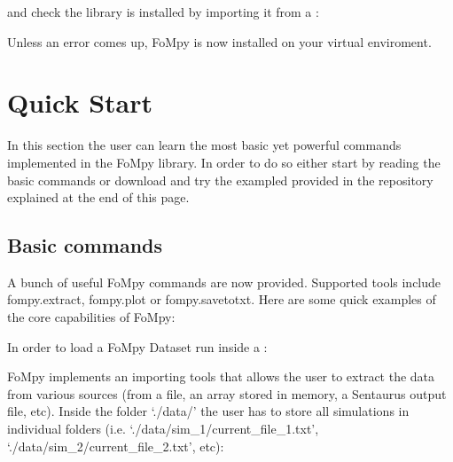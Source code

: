 \documentclass[letterpaper,10pt,english,openany, oneside]{sphinxmanual}
\begin{document}
%
\begin{sphinxVerbatim}[commandchars=\\\{\}]
    
\end{sphinxVerbatim}

and check the library is installed by importing it from a :

%
\begin{sphinxVerbatim}[commandchars=\\\{\}]
 
\end{sphinxVerbatim}

Unless an error comes up, FoMpy is now installed on your virtual enviroment.


\section{Quick Start}
\label{\detokenize{index:quick-start}}
In this section the user can learn the most basic yet powerful commands implemented in the FoMpy library. In order to do so either start by reading the basic commands or
download and try the exampled provided in the repository explained at the end of this page.


\subsection{Basic commands}
\label{\detokenize{index:basic-commands}}
A bunch of useful FoMpy commands are now provided. Supported tools include fompy.extract, fompy.plot or fompy.savetotxt. Here are some quick examples of the core capabilities of FoMpy:

In order to load a FoMpy Dataset run inside a :

%
\begin{sphinxVerbatim}[commandchars=\\\{\}]
 
\end{sphinxVerbatim}

FoMpy implements an importing tools that allows the user to extract the data from various sources
(from a file, an array stored in memory, a Sentaurus output file, etc). Inside the folder ‘./data/’ the user has to store all simulations in individual folders (i.e. ‘./data/sim\_1/current\_file\_1.txt’, ‘./data/sim\_2/current\_file\_2.txt’, etc):
\end{document}
